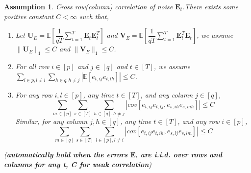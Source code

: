 \documentclass{article}[12pt]
\newtheorem{assumption}{Assumption}
\begin{document}
\begin{assumption}\label{assumption 4 1.7.1}
    Cross row(column) correlation of noise $\mathbf{E}_t$.\normalfont  There exists some positive constant $C<\infty$ such that,
    \begin{enumerate}
        \item Let $\mathbf{U}_E = \mathbb{E}\left[\dfrac{1}{qT}\sum_{t=1}^T\mathbf{E}_t\mathbf{E}_t^T\right]$ and $\mathbf{V}_E = \mathbb{E}\left[\dfrac{1}{qT}\sum_{t=1}^T\mathbf{E}_t^T\mathbf{E}_t\right]$, we assume $\lVert\mathbf{U}_E\rVert_1\leq C$ and $\lVert\mathbf{V}_E\rVert_1\leq C$.
        \item For all row $i \in \left[p\right]$ and $j \in \left[q\right]$ and $t \in \left[T\right]$, we assume $\sum_{l \in p, l \neq i}\sum_{h \in q, h \neq j}|\mathbb{E}\left[e_{t,ij}e_{t,lh}\right]|\leq C$.
        \item For any row $i,l \in \left[p\right]$, any time $t \in \left[T\right]$, and any column $j \in \left[q\right]$,
        $$\sum\limits_{m \in \left[p\right]}\sum\limits_{s \in \left[T\right]}\sum\limits_{h \in \left[q\right], h \neq j}|cov\left[e_{t,ij}e_{t,lj},e_{s,ih}e_{s,mh}\right]| \leq C$$
        Similar, for any column $j,h \in \left[q\right]$, any time $t \in \left[T\right]$, and any row $i \in \left[p\right]$,
        $$\sum\limits_{m \in \left[q\right]}\sum\limits_{s \in \left[T\right]}\sum\limits_{l \in \left[p\right], l \neq i}|cov\left[e_{t,ij}e_{t,ih},e_{s,lj}e_{s,lm}\right]| \leq C$$
    \end{enumerate}
    
    (\textbf{\textit{automatically hold when the errors $\mathbf{E}_t$ are i.i.d. over rows and columns for any t, C for weak correlation}})
\end{assumption}
\end{document}
